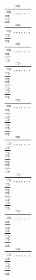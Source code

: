 \documentclass[11pt]{article}
\begin{document}
\begin{center}
\bigskip
\\$\frac{\Rightarrow }{\Rightarrow , , , , , , , }$
\bigskip
\\$\frac{\Rightarrow }{\Rightarrow }$
\bigskip
\\$\frac{\Rightarrow }{\Rightarrow , , , , , , , }$
\bigskip
\\$\frac{\Rightarrow }{\Rightarrow }$
\bigskip
\\$\frac{\Rightarrow }{\Rightarrow , , , , , , , }$
\bigskip
\\$\frac{\Rightarrow }{\Rightarrow }$
\bigskip
\\$\frac{\Rightarrow }{\Rightarrow , , , , , , , }$
\bigskip
\\$\frac{\Rightarrow }{\Rightarrow }$
\bigskip
\\$\frac{\Rightarrow }{\Rightarrow }$
\bigskip
\\$\frac{\Rightarrow }{\Rightarrow }$
\bigskip
\\$\frac{\Rightarrow }{\Rightarrow , , , , , , , }$
\bigskip
\\$\frac{\Rightarrow }{\Rightarrow }$
\bigskip
\\$\frac{\Rightarrow }{\Rightarrow }$
\bigskip
\\$\frac{\Rightarrow }{\Rightarrow }$
\bigskip
\\$\frac{\Rightarrow }{\Rightarrow , , , , , , , }$
\bigskip
\\$\frac{\Rightarrow }{\Rightarrow }$
\bigskip
\\$\frac{\Rightarrow }{\Rightarrow }$
\bigskip
\\$\frac{\Rightarrow }{\Rightarrow }$
\bigskip
\\$\frac{\Rightarrow }{\Rightarrow , , , , , , , }$
\bigskip
\\$\frac{\Rightarrow }{\Rightarrow }$
\bigskip
\\$\frac{\Rightarrow }{\Rightarrow }$
\bigskip
\\$\frac{\Rightarrow }{\Rightarrow }$
\bigskip
\\$\frac{\Rightarrow }{\Rightarrow , , , , , , , }$
\bigskip
\\$\frac{\Rightarrow }{\Rightarrow }$
\bigskip
\\$\frac{\Rightarrow }{\Rightarrow }$
\bigskip
\\$\frac{\Rightarrow }{\Rightarrow }$
\bigskip
\\$\frac{\Rightarrow }{\Rightarrow , , , , , , , }$
\bigskip
\\$\frac{\Rightarrow }{\Rightarrow }$
\bigskip
\\$\frac{\Rightarrow }{\Rightarrow }$

\end{center}
\end{document}
